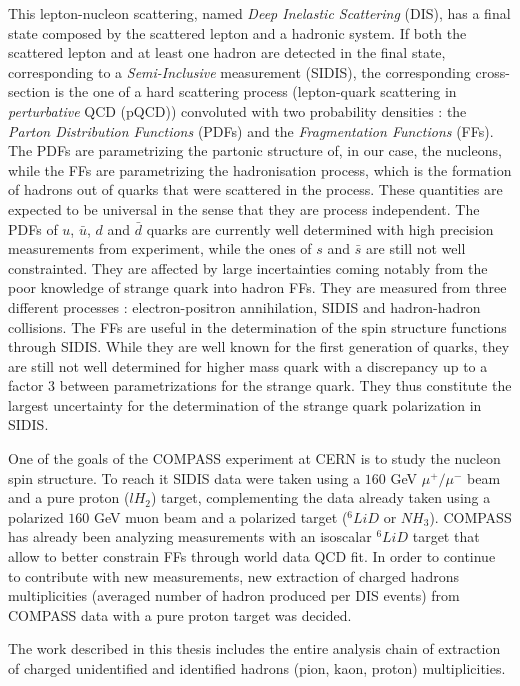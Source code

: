 This lepton-nucleon scattering, named \textit{Deep Inelastic Scattering} (DIS), has a final state composed by the scattered lepton and a hadronic system. If both the scattered lepton and at least one hadron are detected in the final state, corresponding to a \textit{Semi-Inclusive} measurement (SIDIS), the corresponding cross-section is the one of a hard scattering process (lepton-quark scattering in \textit{perturbative} QCD (pQCD)) convoluted with two probability densities : the \textit{Parton Distribution Functions} (PDFs) and the \textit{Fragmentation Functions} (FFs). The PDFs are parametrizing the partonic structure of, in our case, the nucleons, while the FFs are parametrizing the hadronisation process, which is the formation of hadrons out of quarks that were scattered in the process. These quantities are expected to be universal in the sense that they are process independent. The PDFs of $u$, $\bar{u}$, $d$ and $\bar{d}$ quarks are currently well determined with high precision measurements from experiment, while the ones of $s$ and $\bar{s}$ are still not well constrainted. They are affected by large incertainties coming notably from the poor knowledge of strange quark into hadron FFs. They are measured from three different processes : electron-positron annihilation, SIDIS and hadron-hadron collisions. The FFs are useful in the determination of the spin structure functions through SIDIS. While they are well known for the first generation of quarks, they are still not well determined for higher mass quark with a discrepancy up to a factor $3$ between parametrizations for the strange quark. They thus constitute the largest uncertainty for the determination of the strange quark polarization in SIDIS\cite{COMPASSstrange}.

One of the goals of the COMPASS experiment at CERN is to study the nucleon spin structure. To reach it SIDIS data were taken using a $160$ GeV $\mu^+/\mu^-$ beam and a pure proton ($lH_2$) target, complementing the data already taken using a polarized $160$ GeV muon beam and a polarized target ($^6LiD$ or $NH_3$). COMPASS has already been analyzing measurements with an isoscalar $^6LiD$ target that allow to better constrain FFs through world data QCD fit. In order to continue to contribute with new measurements, new extraction of charged hadrons multiplicities (averaged number of hadron produced per DIS events) from COMPASS data with a pure proton target was decided.

The work described in this thesis includes the entire analysis chain of extraction of charged unidentified and identified hadrons (pion, kaon, proton) multiplicities.

